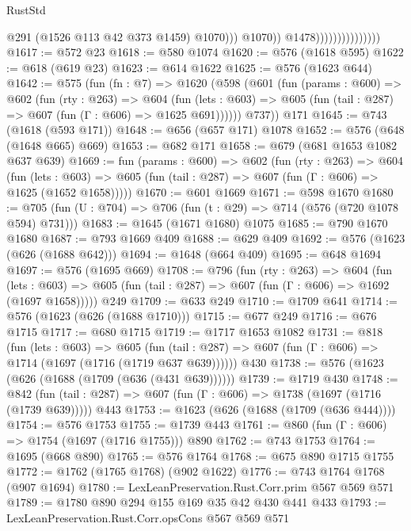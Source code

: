 \begin{lexlean}{RustStd}
\begin{coremodule}
                                            @291
                                            (@1526 @113 @42 @373 @1459)
                                            @1070)))
                                      @1070))
                                  @1478)))))))))))))))
@1617 := @572 @23
@1618 := @580 @1074
@1620 := @576 (@1618 @595)
@1622 := @618 (@619 @23)
@1623 := @614 @1622
@1625 := @576 (@1623 @644)
@1642 := @575
    (fun (fn : @7) =>
    @1620
      (@598
        (@601
          (fun (params : @600) =>
          @602
            (fun (rty : @263) =>
            @604
              (fun (lets : @603) =>
              @605 (fun (tail : @287) => @607 (fun (Γ : @606) => @1625 @691))))))
        @737))
    @171
@1645 := @743 (@1618 (@593 @171))
@1648 := @656 (@657 @171) @1078
@1652 := @576 (@648 (@1648 @665) @669)
@1653 := @682 @171
@1658 := @679 (@681 @1653 @1082 @637 @639)
@1669 := fun (params : @600) =>
  @602
    (fun (rty : @263) =>
    @604
      (fun (lets : @603) =>
      @605 (fun (tail : @287) => @607 (fun (Γ : @606) => @1625 (@1652 @1658)))))
@1670 := @601 @1669
@1671 := @598 @1670
@1680 := @705 (fun (U : @704) => @706 (fun (t : @29) => @714 (@576 (@720 @1078 @594) @731)))
@1683 := @1645 (@1671 @1680) @1075
@1685 := @790 @1670 @1680
@1687 := @793 @1669 @409
@1688 := @629 @409
@1692 := @576 (@1623 (@626 (@1688 @642)))
@1694 := @1648 (@664 @409)
@1695 := @648 @1694
@1697 := @576 (@1695 @669)
@1708 := @796
    (fun (rty : @263) =>
    @604
      (fun (lets : @603) =>
      @605 (fun (tail : @287) => @607 (fun (Γ : @606) => @1692 (@1697 @1658)))))
    @249
@1709 := @633 @249
@1710 := @1709 @641
@1714 := @576 (@1623 (@626 (@1688 @1710)))
@1715 := @677 @249
@1716 := @676 @1715
@1717 := @680 @1715
@1719 := @1717 @1653 @1082
@1731 := @818
    (fun (lets : @603) =>
    @605 (fun (tail : @287) => @607 (fun (Γ : @606) => @1714 (@1697 (@1716 (@1719 @637 @639))))))
    @430
@1738 := @576 (@1623 (@626 (@1688 (@1709 (@636 (@431 @639))))))
@1739 := @1719 @430
@1748 := @842
    (fun (tail : @287) => @607 (fun (Γ : @606) => @1738 (@1697 (@1716 (@1739 @639)))))
    @443
@1753 := @1623 (@626 (@1688 (@1709 (@636 @444))))
@1754 := @576 @1753
@1755 := @1739 @443
@1761 := @860 (fun (Γ : @606) => @1754 (@1697 (@1716 @1755))) @890
@1762 := @743 @1753
@1764 := @1695 (@668 @890)
@1765 := @576 @1764
@1768 := @675 @890 @1715 @1755
@1772 := @1762 (@1765 @1768) (@902 @1622)
@1776 := @743 @1764 @1768 (@907 @1694)
@1780 := LexLeanPreservation.Rust.Corr.prim @567 @569 @571
@1789 := @1780 @890 @294 @155 @169 @35 @42 @430 @441 @433
@1793 := LexLeanPreservation.Rust.Corr.opsCons @567 @569 @571

\end{coremodule}
\end{lexlean}
